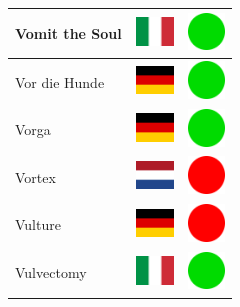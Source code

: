 \documentclass[12pt, a4paper, twoside]{report}
\begin{document}
\begin{center}
\begin{longtable}{|p{5cm}|p{2cm}|p{2cm}|}
 Vomit the Soul                                             & \includegraphics[width=1cm]{../img/flags/it} &   \includegraphics[width=1cm]{../likes/y} \\ \hline
 Vor die Hunde                                              & \includegraphics[width=1cm]{../img/flags/de} &   \includegraphics[width=1cm]{../likes/y} \\ \hline
 Vorga                                                      & \includegraphics[width=1cm]{../img/flags/de} &   \includegraphics[width=1cm]{../likes/y} \\ \hline
 Vortex                                                     & \includegraphics[width=1cm]{../img/flags/nl} &   \includegraphics[width=1cm]{../likes/n} \\ \hline
 Vulture                                                    & \includegraphics[width=1cm]{../img/flags/de} &   \includegraphics[width=1cm]{../likes/n} \\ \hline
 Vulvectomy                                                 & \includegraphics[width=1cm]{../img/flags/it} &   \includegraphics[width=1cm]{../likes/y} \\ \hline

\end{longtable}
\end{center}
\end{document}

